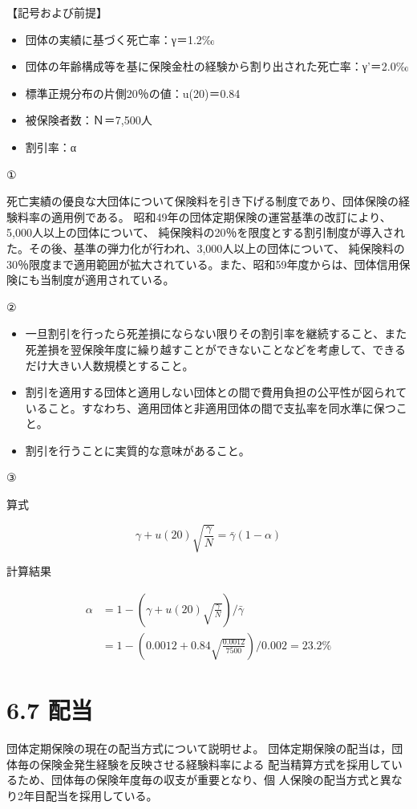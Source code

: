 \documentclass[report,gutter=10mm,fore-edge=10mm,uplatex,dvipdfmx]{jlreq}
\begin{document}
【記号および前提】

\begin{itemize}
\item[] 団体の実績に基づく死亡率：γ＝1.2‰
\item[] 団体の年齢構成等を基に保険金杜の経験から割り出された死亡率：γ’＝2.0‰
\item[] 標準正規分布の片側20％の値：u(20)＝0.84
\item[] 被保険者数：Ｎ＝7,500人
\item[] 割引率：α
\end{itemize}
\answer{}

①

死亡実績の優良な大団体について保険料を引き下げる制度であり、団体保険の経験料率の適用例である。
昭和49年の団体定期保険の運営基準の改訂により、5,000人以上の団体について、
純保険料の20％を限度とする割引制度が導入された。その後、基準の弾力化が行われ、3,000人以上の団体について、
純保険料の30％限度まで適用範囲が拡大されている。また、昭和59年度からは、団体信用保険にも当制度が適用されている。

②
\begin{itemize}
\item[] 一旦割引を行ったら死差損にならない限りその割引率を継続すること、また死差損を翌保険年度に繰り越すことができないことなどを考慮して、できるだけ大きい人数規模とすること。
\item[] 割引を適用する団体と適用しない団体との間で費用負担の公平性が図られていること。すなわち、適用団体と非適用団体の間で支払率を同水準に保つこと。
\item[] 割引を行うことに実質的な意味があること。
\end{itemize}

③

算式

$$
\gamma+u(20)\sqrt{\frac{\gamma}{N}} = \bar{\gamma}(1-\alpha)
$$

計算結果

\begin{align}
\alpha & = 1-\left(\gamma+u(20)\sqrt{\frac{\gamma}{N}}\right)/\bar{\gamma}\\
&= 1-\left(0.0012 + 0.84\sqrt{\frac{0.0012}{7500}}\right)/0.002=23.2\%
\end{align}

\section{6.7 配当}
団体定期保険の現在の配当方式について説明せよ。
\answer{}
団体定期保険の配当は，団体毎の保険金発生経験を反映させる経験料率による
配当精算方式を採用しているため、団体毎の保険年度毎の収支が重要となり、個
人保険の配当方式と異なり2年目配当を採用している。
\end{document}
